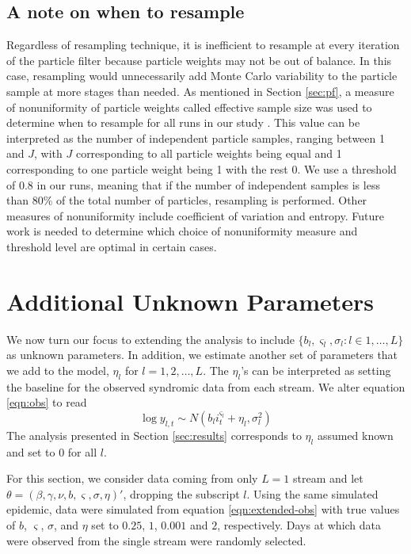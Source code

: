 \documentclass{elsarticle}
\begin{document}
\subsection{A note on when to resample}

Regardless of resampling technique, it is inefficient to resample at every iteration of the particle filter because particle weights may not be out of balance. In this case, resampling would unnecessarily add Monte Carlo variability to the particle sample at more stages than needed. As mentioned in Section \ref{sec:pf}, a measure of nonuniformity of particle weights called effective sample size was used to determine when to resample for all runs in our study \citep{Liu:Chen:Wong:reje:1998}. This value can be interpreted as the number of independent particle samples, ranging between 1 and $J$, with $J$ corresponding to all particle weights being equal and 1 corresponding to one particle weight being 1 with the rest 0. We use a threshold of 0.8 in our runs, meaning that if the number of independent samples is less than 80\% of the total number of particles, resampling is performed. Other measures of nonuniformity include coefficient of variation and entropy. Future work is needed to determine which choice of nonuniformity measure and threshold level are optimal in certain cases.

\section{Additional Unknown Parameters \label{sec:extend}}

We now turn our focus to extending the analysis to include $\{b_l,\varsigma_l,\sigma_l:l\in1,\ldots,L\}$ as unknown parameters. In addition, we estimate another set of parameters that we add to the model, $\eta_l$ for $l = 1,2,\ldots,L$. The $\eta_l$'s can be interpreted as setting the baseline for the observed syndromic data from each stream. We alter equation \eqref{eqn:obs} to read
\begin{equation}
\log y_{l,t} \sim N\left(b_li_t^{\varsigma_l} + \eta_l,\sigma_l^2\right) \label{eqn:extended-obs}
\end{equation}
\noindent The analysis presented in Section \ref{sec:results} corresponds to $\eta_l$ assumed known and set to 0 for all $l$.

For this section, we consider data coming from only $L = 1$ stream and let $\theta = (\beta, \gamma, \nu, b, \varsigma, \sigma, \eta)'$, dropping the subscript $l$. Using the same simulated epidemic, data were simulated from equation \eqref{eqn:extended-obs} with true values of $b$, $\varsigma$, $\sigma$, and $\eta$ set to $0.25$, $1$, $0.001$ and $2$, respectively. Days at which data were observed from the single stream were randomly selected.
\end{document}
